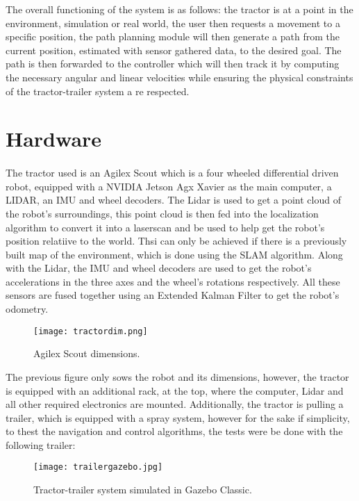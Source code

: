 The overall functioning of the system is as follows: the tractor is at a point in the environment, simulation or real world, 
the user then requests a movement to a specific position, the path planning module will then generate a path from the current 
position, estimated with sensor gathered data, to the desired goal. The path is then forwarded to the 
controller which will then track it by computing the necessary angular and linear velocities while ensuring the 
physical constraints of the tractor-trailer system a re respected.
 


\section{Hardware}
\label{sec:hardware}

\paragraph{}The tractor used is an Agilex Scout which is a four wheeled differential driven robot, 
equipped with a NVIDIA Jetson Agx Xavier as the main computer, a LIDAR, an \gls{IMU} and wheel decoders. The Lidar is 
used to get a point cloud of the robot's surroundings, this point cloud is then fed 
into the localization algorithm to convert it into a laserscan and be used to help get 
the robot's position relatiive to the world. Thsi can only be achieved if there is 
a previously built map of the environment, which is done using the \gls{SLAM} algorithm. Along with 
the Lidar, the \gls{IMU} and wheel decoders are used to get the robot's accelerations in the three axes and the 
wheel's rotations respectively. All these sensors are fused together using an Extended Kalman Filter to get the robot's 
odometry.
 
\begin{figure}[h]
    \centering
    \texttt{[image: tractordim.png]}
    \caption{Agilex Scout dimensions.}
\end{figure}

The previous figure only sows the robot and its dimensions, however, the 
tractor is equipped with an additional rack, at the top, where the computer, Lidar and all other required electronics 
are mounted.
Additionally, the tractor is pulling a trailer, which is equipped with 
a spray system, however for the sake if simplicity, to thest the navigation 
and control algorithms, the tests were be done with the following trailer:
\clearpage
\begin{figure}[h]
    \centering
    \texttt{[image: trailergazebo.jpg]}
    \caption{Tractor-trailer system simulated in Gazebo Classic.}
\end{figure}

